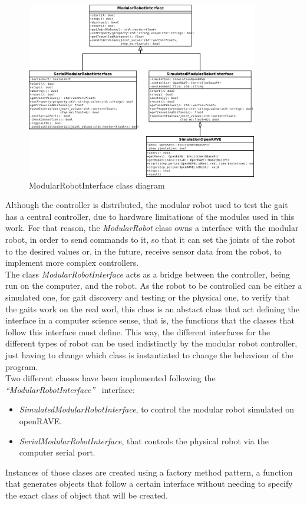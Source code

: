 \begin{figure}[h]
		\centering
        \includegraphics[width=0.9\textwidth]{images/Class_diagram_ModularRobotInterface.png}
        \caption{ModularRobotInterface class diagram}\label{fig:software_class_modularorobotinterface_class}
\end{figure}

Although the controller is distributed, the modular robot used to test the gait has a central controller, due to hardware limitations of the modules used in this work. For that reason, the \emph{ModularRobot} class owns a interface with the modular robot, in order to send commands to it, so that it can set the joints of the robot to the desired values or, in the future, receive sensor data from the robot, to implement more complex controllers.\\

The class \emph{ModularRobotInterface} acts as a bridge between the controller, being run on the computer, and the robot. As the robot to be controlled can be either a simulated one, for gait discovery and testing or the physical one, to verify that the gaits work on the real worl, this class is an abstact class that act defining the interface in a computer science sense, that is, the functions that the classes that follow this interface must define. This way, the different interfaces for the different types of robot can be used indistinctly by the modular robot controller, just having to change which class is instantiated to change the behaviour of the program.\\

Two different classes have been implemented following the \emph{``ModularRobotInterface''} ~interface:
\begin{itemize}
	\item \emph{SimulatedModularRobotInterface}, to control the modular robot simulated on openRAVE.
	\item \emph{SerialModularRobotInterface}, that controls the physical robot via the  computer serial port.
\end{itemize}
Instances of those clases are created using a factory method pattern, a function that generates objects that follow a certain interface without needing to specify the exact class of object that will be created.\\

